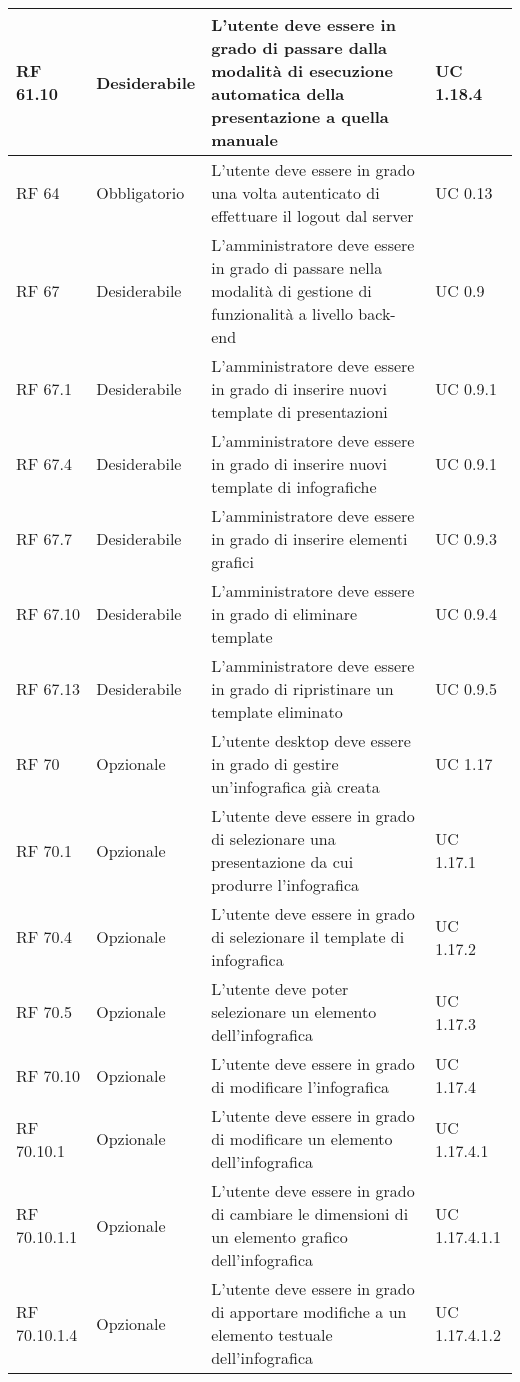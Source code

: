 {\begin{longtable} [c]{| p{2.5cm} | p{2.5cm} | p{6cm} |p{2.5cm}|}
 \hline 
RF 61.10 & Desiderabile & L'utente deve essere in grado di passare dalla modalità di esecuzione automatica della presentazione a quella manuale & UC 1.18.4\\ 
 \hline 
RF 64 & Obbligatorio & L'utente deve essere in grado una volta autenticato di effettuare il logout dal server & UC 0.13\\ 
 \hline 
RF 67 & Desiderabile & L'amministratore deve essere in grado di passare nella modalità di gestione di funzionalità a livello back-end & UC 0.9\\ 
 \hline 
RF 67.1 & Desiderabile & L'amministratore deve essere in grado di inserire nuovi template di presentazioni & UC 0.9.1\\ 
 \hline 
RF 67.4 & Desiderabile & L'amministratore deve essere in grado di inserire nuovi template di infografiche & UC 0.9.1\\ 
 \hline 
RF 67.7 & Desiderabile & L'amministratore deve essere in grado di inserire elementi grafici & UC 0.9.3\\ 
 \hline 
RF 67.10 & Desiderabile & L'amministratore deve essere in grado di eliminare template & UC 0.9.4\\ 
 \hline 
RF 67.13 & Desiderabile & L'amministratore deve essere in grado di ripristinare un template eliminato & UC 0.9.5\\ 
 \hline 
RF 70 & Opzionale & L'utente desktop deve essere in grado di gestire un'infografica già creata & UC 1.17\\ 
 \hline 
RF 70.1 & Opzionale & L'utente deve essere in grado di selezionare una presentazione da cui produrre l'infografica & UC 1.17.1\\ 
 \hline 
RF 70.4 & Opzionale & L'utente deve essere in grado di selezionare il template di infografica & UC 1.17.2\\ 
 \hline 
RF 70.5 & Opzionale & L'utente deve poter selezionare un elemento dell'infografica & UC 1.17.3\\ 
 \hline 
RF 70.10 & Opzionale & L'utente deve essere in grado di modificare l'infografica & UC 1.17.4\\ 
 \hline 
RF 70.10.1 & Opzionale & L'utente deve essere in grado di modificare un elemento dell'infografica & UC 1.17.4.1\\ 
 \hline 
RF 70.10.1.1 & Opzionale & L'utente deve essere in grado di cambiare le dimensioni di un elemento grafico dell'infografica & UC 1.17.4.1.1\\ 
 \hline 
RF 70.10.1.4 & Opzionale & L'utente deve essere in grado di apportare modifiche a un elemento testuale dell'infografica & UC 1.17.4.1.2\\ 

\end{longtable}}
